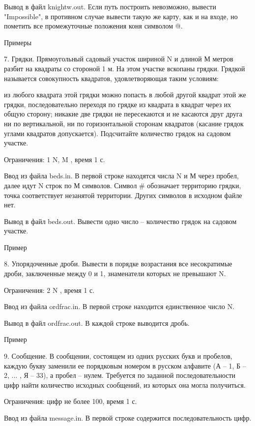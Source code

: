 \documentclass[]{article}
\begin{document}
Вывод в файл knightw.out. Если путь построить невозможно, вывести "Impossible", в противном случае вывести такую же карту, как и на входе, но пометить все промежуточные положения коня символом @.

Примеры



7. Грядки. Прямоугольный садовый участок шириной N и длиной М метров разбит на квадраты со стороной 1 м. На этом участке вскопаны грядки. Грядкой называется совокупность квадратов, удовлетворяющая таким условиям:

из любого квадрата этой грядки можно попасть в любой другой квадрат этой же грядки, последовательно переходя по грядке из квадрата в квадрат через их общую сторону;
никакие две грядки не пересекаются и не касаются друг друга ни по вертикальной, ни по горизонтальной сторонам квадратов (касание грядок углами квадратов допускается).
Подсчитайте количество грядок на садовом участке.

Ограничения: 1 \leq N, M , время 1 с.

Ввод из файла beds.in. В первой строке находятся числа N и М через пробел, далее идут N строк по М символов. Символ # обозначает территорию грядки, точка соответствует незанятой территории. Других символов в исходном файле нет.

Вывод в файл beds.out. Вывести одно число – количество грядок на садовом участке.

Пример



8. Упорядоченные дроби. Вывести в порядке возрастания все несократимые дроби, заключенные между 0 и 1, знаменатели которых не превышают N.

Ограничения: 2 \leq N , время 1 с.

Ввод из файла ordfrac.in. В первой строке находится единственное число N.

Вывод в файл ordfrac.out. В каждой строке выводится дробь.

Пример



9. Сообщение. В сообщении, состоящем из одних русских букв и пробелов, каждую букву заменили ее порядковым номером в русском алфавите (А – 1, Б – 2, ... , Я – 33), а пробел – нулем. Требуется по заданной последовательности цифр найти количество исходных сообщений, из которых она могла получиться.

Ограничения: цифр не более 100, время 1 с.

Ввод из файла message.in. В первой строке содержится последовательность цифр.
\end{document}
